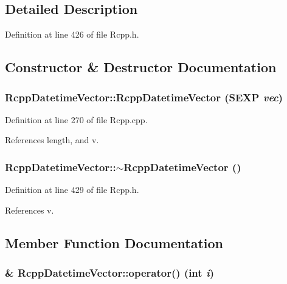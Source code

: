 \subsection{Detailed Description}


Definition at line 426 of file Rcpp.h.

\subsection{Constructor \& Destructor Documentation}
\hypertarget{classRcppDatetimeVector_a1c1d1e2087fdc8e7601299dc2c4fe24c}{
\subsubsection[{RcppDatetimeVector}]{\setlength{\rightskip}{0pt plus 5cm}RcppDatetimeVector::RcppDatetimeVector (SEXP {\em vec})}}
\label{classRcppDatetimeVector_a1c1d1e2087fdc8e7601299dc2c4fe24c}


Definition at line 270 of file Rcpp.cpp.

References length, and v.\hypertarget{classRcppDatetimeVector_a81d6c5daba7448058a2f896841ddeb3a}{
\subsubsection[{$\sim$RcppDatetimeVector}]{\setlength{\rightskip}{0pt plus 5cm}RcppDatetimeVector::$\sim$RcppDatetimeVector ()}}
\label{classRcppDatetimeVector_a81d6c5daba7448058a2f896841ddeb3a}


Definition at line 429 of file Rcpp.h.

References v.

\subsection{Member Function Documentation}
\hypertarget{classRcppDatetimeVector_a2ffa33b5231a7975652e1e2498d0e16a}{
\subsubsection[{operator()}]{\& RcppDatetimeVector::operator() (int {\em i})}}
\label{classRcppDatetimeVector_a2ffa33b5231a7975652e1e2498d0e16a}


